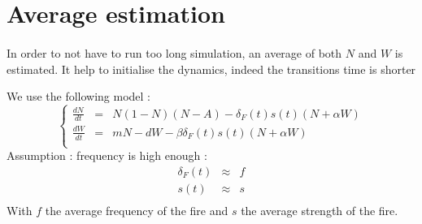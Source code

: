 \documentclass{article}
\begin{document}

\newpage
\section{Average estimation}
\label{average}

\paragraph{}
In order to not have to run too long simulation, an average of both $N$ and $W$ is estimated. It help to initialise the dynamics, indeed the transitions time is shorter

We use the following model :
\[
\left\lbrace
\begin{array}{rcl}
\frac{dN}{dt} & = & N(1-N)(N-A) - \delta_F(t)s(t)(N+\alpha W) \\
\frac{dW}{dt} & = & mN -dW - \beta\delta_F(t)s(t)(N+\alpha W) \\
\end{array}
\right.
\]
Assumption : frequency is high enough : 
\[
\begin{array}{rcl}
\delta_F(t) & \approx & f \\
s(t) & \approx & s \\
\end{array}
\]
With $f$ the average frequency of the fire and $s$ the average strength of the fire.
\end{document}

